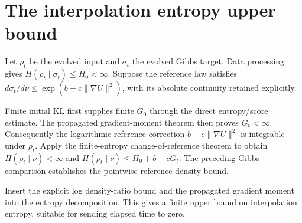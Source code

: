 \documentclass[11pt,a4paper]{article}
\begin{document}
\section{\texorpdfstring{The interpolation entropy upper bound}{The interpolation entropy upper bound}}


Let \(\rho_t\) be the evolved input and \(\sigma_t\) the evolved Gibbs target. Data processing gives \(H(\rho_t\mid\sigma_t)\le H_0<\infty\). Suppose the reference law satisfies \(d\sigma_t/d\nu\le\exp(b+c\|\nabla U\|^2)\), with its absolute continuity retained explicitly.



Finite initial KL first supplies finite \(G_0\) through the direct entropy/\allowbreak{}score estimate. The propagated gradient-moment theorem then proves \(G_t<\infty\). Consequently the logarithmic reference correction \(b+c\|\nabla U\|^2\) is integrable under \(\rho_t\). Apply the finite-entropy change-of-reference theorem to obtain \(H(\rho_t\mid\nu)<\infty\) and \(H(\rho_t\mid\nu)\le H_0+b+cG_t\). The preceding Gibbs comparison establishes the pointwise reference-density bound.



Insert the explicit log density-ratio bound and the propagated gradient moment into the entropy decomposition. This gives a finite upper bound on interpolation entropy, suitable for sending elapsed time to zero.
\end{document}
